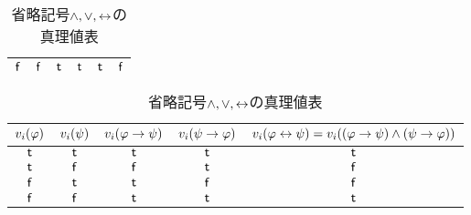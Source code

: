 \begin{myCorollary}
\begin{table}[H]
\begin{subtable}{\linewidth}
\begin{tabular}{|c|c|c|c|c|c|}
        $\mathsf{f}$                                 & $\mathsf{f}$                              & $\mathsf{t}$                                       & $\mathsf{t}$                                    & $\mathsf{t}$                                                       & $\mathsf{f}$                                                                                                                \\ \hline
      \end{tabular}
    \end{subtable}
    \linebreak
    \begin{subtable}{\linewidth}\centering
      \centering
      \begin{tabular}{|c|c|c|c|c|}\hline
        $v_i(\varphi)$ & $v_i(\psi)$ & $v_i(\varphi \to \psi)$ & $v_i(\psi \to \varphi)$ & $v_i(\varphi \leftrightarrow \psi) = v_i((\varphi \to \psi) \land (\psi \to \varphi))$ \\ \hline
        $\mathsf{t}$                                  & $\mathsf{t}$                               & $\mathsf{t}$                                           & $\mathsf{t}$                                           & $\mathsf{t}$                                                                                                                              \\ \hline
        $\mathsf{t}$                                  & $\mathsf{f}$                              & $\mathsf{f}$                                          & $\mathsf{t}$                                           & $\mathsf{f}$                                                                                                                             \\ \hline
        $\mathsf{f}$                                 & $\mathsf{t}$                               & $\mathsf{t}$                                           & $\mathsf{f}$                                          & $\mathsf{f}$                                                                                                                             \\ \hline
        $\mathsf{f}$                                 & $\mathsf{f}$                              & $\mathsf{t}$                                           & $\mathsf{t}$                                           & $\mathsf{t}$                                                                                                                              \\ \hline
      \end{tabular}
    \end{subtable}
    \caption{省略記号$\land, \lor, \leftrightarrow$の真理値表}
    \label{table:prop:table-and-or-iff}
  \end{table}

\end{myCorollary}

